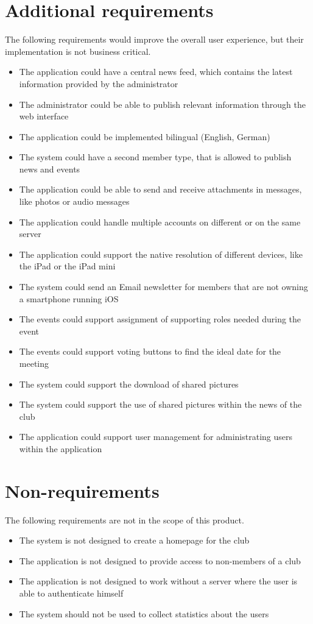 \section{Additional requirements}
The following requirements would improve the overall user experience, but their implementation is not business critical.
\begin{itemize}
\item The application could have a central news feed, which contains the latest information provided by the administrator
\item The administrator could be able to publish relevant information through the web interface
\item The application could be implemented bilingual (English, German)
\item The system could have a second member type, that is allowed to publish news and events
\item The application could be able to send and receive attachments in messages, like photos or audio messages
\item The application could handle multiple accounts on different or on the same server
\item The application could support the native resolution of different devices, like the iPad or the iPad mini
\item The system could send an Email newsletter for members that are not owning a smartphone running iOS
\item The events could support assignment of supporting roles needed during the event
\item The events could support voting buttons to find the ideal date for the meeting
\item The system could support the download of shared pictures
\item The system could support the use of shared pictures within the news of the club
\item The application could support user management for administrating users within the application
\end{itemize}

\section{Non-requirements} %
The following requirements are not in the scope of this product.
\begin{itemize}
\item The system is not designed to create a homepage for the club
\item The application is not designed to provide access to non-members of a club
\item The application is not designed to work without a server where the user is able to authenticate himself
\item The system should not be used to collect statistics about the users
\end{itemize}

